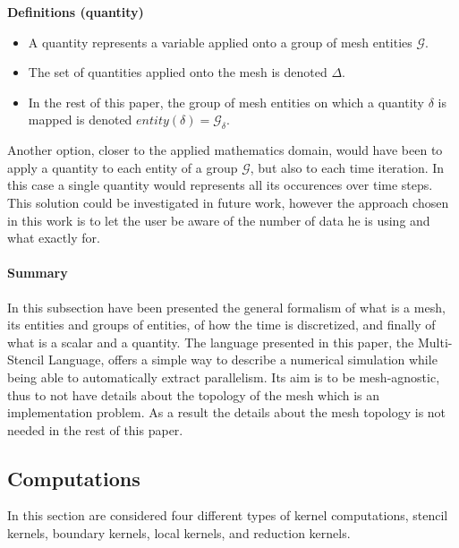 \medskip
\noindent \textbf{Definitions (quantity)}
\begin{itemize}
\item A quantity represents a variable applied onto a group of mesh entities $\mathcal{G}$.
\item The set of quantities applied onto the mesh is denoted $\Delta$.
\item In the rest of this paper, the group of mesh entities on which a quantity $\delta$ is mapped is denoted $entity(\delta)=\mathcal{G}_{\delta}$.
\end{itemize}

Another option, closer to the applied mathematics domain, would have been to apply a quantity to each entity of a group $\mathcal{G}$, but also to each time iteration. In this case a single quantity would represents all its occurences over time steps. This solution could be investigated in future work, however the approach chosen in this work is to let the user be aware of the number of data he is using and what exactly for.

\paragraph{\textbf{Summary}} In this subsection have been presented the general formalism of what is a mesh, its entities and groups of entities, of how the time is discretized, and finally of what is a scalar and a quantity. The language presented in this paper, the Multi-Stencil Language, offers a simple way to describe a numerical simulation while being able to automatically extract parallelism. Its aim is to be mesh-agnostic, thus to not have details about the topology of the mesh which is an implementation problem. As a result the details about the mesh topology is not needed in the rest of this paper.

\subsection{Computations}

In this section are considered four different types of kernel computations, stencil kernels, boundary kernels, local kernels, and reduction kernels. 

